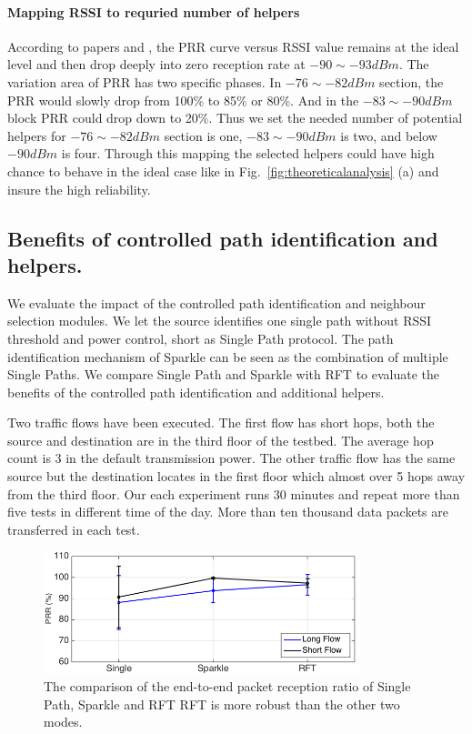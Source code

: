 \documentclass[conference]{IEEEtran}
\begin{document}
\paragraph{Mapping RSSI to requried number of helpers}
According to papers \cite{srinivasan2006and} and  \cite{wu2008realistic} , the PRR curve versus RSSI value remains at the ideal level and then drop deeply into zero reception rate at $-90\sim-93dBm$. The variation area of PRR has two specific phases. In $-76\sim-82dBm$ section, the PRR would slowly drop from 100\% to 85\% or 80\%. And in the $-83\sim-90dBm$ block PRR could drop down to 20\%. Thus we set the needed number of potential helpers for $-76 \sim -82dBm$ section is one, $-83\sim-90dBm$ is two, and below $-90dBm$ is four. Through this mapping the selected helpers could have high chance to behave in the ideal case like in Fig.~\ref{fig:theoreticalanalysis} (a) and insure the high reliability.

\subsection{Benefits of controlled path identification and helpers.}
\label{sec:benefitsofhelpers}
We evaluate the impact of the controlled path identification and neighbour selection modules. We let the source identifies one single path without RSSI threshold and power control, short as Single Path protocol. The path identification mechanism of Sparkle can be seen as the combination of multiple Single Paths. We compare Single Path and Sparkle with RFT to evaluate the benefits of the controlled path identification and additional helpers. 

Two traffic flows have been executed. The first flow has short hops, both the source and destination are in the third floor of the testbed. The average hop count is 3 in the default transmission power. The other traffic flow has the same source but the destination locates in the first floor which almost over 5 hops away from the third floor. Our each experiment runs 30 minutes and repeat more than five tests in different time of the day. More than ten thousand data packets are transferred in each test. 
\begin{figure}
\centering
\includegraphics[height=3.55cm]{errorbar_prr_single_sp_rft.png}
\caption{The comparison of the end-to-end packet reception ratio of Single Path, Sparkle and RFT RFT is more robust than the other two modes.}
\label{fig:prr_error_single}
\end{figure}
\end{document}
